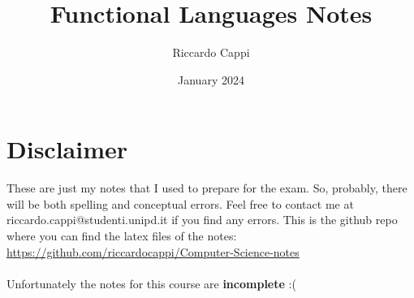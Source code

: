 \documentclass{extbook}
\title{Functional Languages Notes}
\author{Riccardo Cappi}
\date{January 2024}
\begin{document}
\maketitle

\section{Disclaimer}
These are just my notes that I used to prepare for the exam. So, probably, there will be both spelling and conceptual errors. Feel free to contact me at riccardo.cappi@studenti.unipd.it if you find any errors. This is the github repo where you can find the latex files of the notes: \url{https://github.com/riccardocappi/Computer-Science-notes}\\\\
Unfortunately the notes for this course are \textbf{incomplete} :(

\tableofcontents










\end{document}
